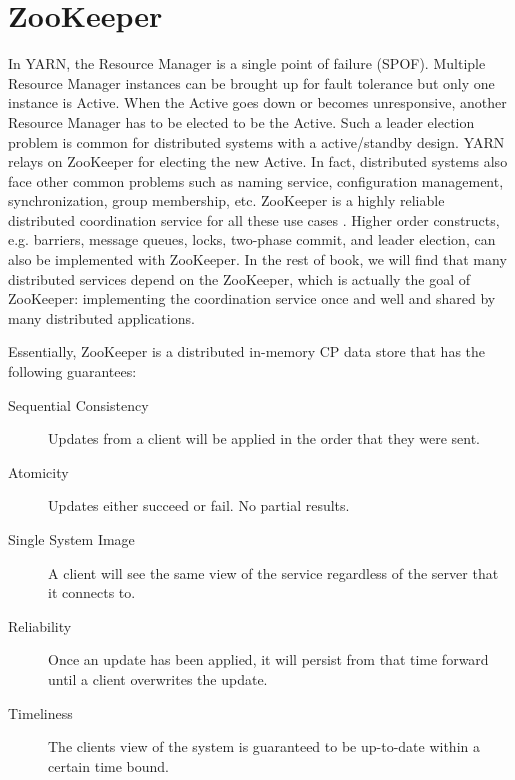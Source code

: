 \documentclass[12pt]{book}
\begin{document}
\section[ZooKeeper]
{ZooKeeper}
In YARN, the Resource Manager is a single point of failure (SPOF). Multiple Resource Manager instances can be brought up for fault tolerance but only one instance is Active. 
When the Active goes down or becomes unresponsive, another Resource Manager has to be elected to be the Active. Such a leader election problem is common for distributed systems with a active/standby design. YARN relays on ZooKeeper for electing the new Active. In fact, distributed systems also face other common problems such as naming service, configuration management, synchronization, group membership, etc. ZooKeeper is a highly reliable distributed coordination service for all these use cases \cite{ZooKeeper}. Higher order constructs, e.g. barriers, message queues, locks, two-phase commit, and leader election, can also be implemented with ZooKeeper. In the rest of book, we will find that many distributed services depend on the ZooKeeper, which is actually the goal of ZooKeeper: implementing the coordination service once and well and shared by many distributed applications.

Essentially, ZooKeeper is a distributed in-memory CP data store that has the following guarantees:
\begin{description}
\item[Sequential Consistency] Updates from a client will be applied in the order that they were sent.
\item[Atomicity] Updates either succeed or fail. No partial results.
\item[Single System Image] A client will see the same view of the service regardless of the server that it connects to.
\item[Reliability] Once an update has been applied, it will persist from that time forward until a client overwrites the update.
\item[Timeliness] The clients view of the system is guaranteed to be up-to-date within a certain time bound.
\end{description}
\end{document}
